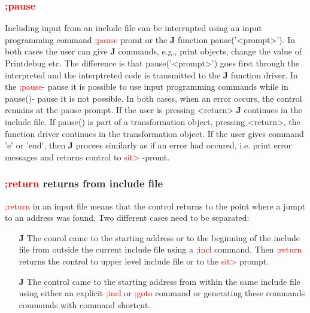 \subsubsection{\textcolor{Red}{;pause}}
\label{inpupause}
Including input from an include file can be interrupted using an input programming
command \textcolor{Red}{;pause} promt or the \textbf{J} function \textcolor{VioletRed}{pause}('<prompt>'). In both cases
the user can give \textbf{J} commands, e.g., print objects, change the value of Printdebug etc.
The difference is that  \textcolor{VioletRed}{pause}('<prompt>') goes first through the interpreted and the interptreted
code is transmitted to the \textbf{J} function driver. In the \textcolor{Red}{;pause}- pause it is possible to
use input programming commands while in \textcolor{VioletRed}{pause}()- pause it is not possible. In both cases, when
an error occurs, the control remains at the pause prompt. If the user is pressing
<return> \textbf{J} continues in the include file. If \textcolor{VioletRed}{pause}() is part of a transformation object,
pressing <return>, the function driver continues in the transformation object.
If the user gives command 'e' or 'end', then \textbf{J} procees similarly as if an error had occured,
i.e. print error messages and returns control to \textcolor{Red}{sit>} -promt.
\subsubsection{\textcolor{Red}{;return} returns from include file}
\label{inpureturn}
\textcolor{Red}{;return} in an input file means that the control returns to the point where a
jumpt to an address was found. Two different cases need to be separated:
\begin{itemize}
\item[\textbf{J}] The conrol came to the starting address or to the beginning of the include file
from outside the current include file using a \textcolor{Red}{;incl} command. Then \textcolor{Red}{;return} returns the control to upper level include
file or to the \textcolor{Red}{sit>} prompt.
\item[\textbf{J}] The control came to the starting address from within the same include file using
either an explicit \textcolor{Red}{;incl} or \textcolor{Red}{;goto} command or generating these commands commands
with command shortcut.
\end{itemize}
